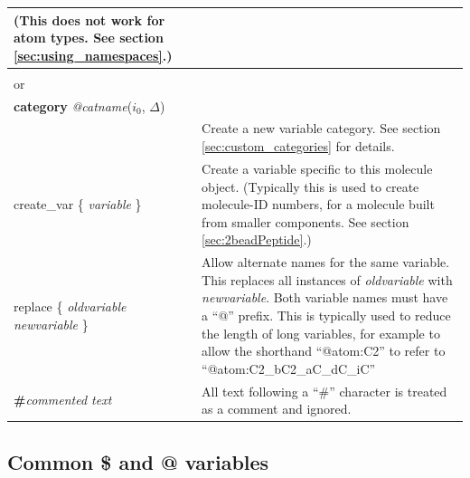 \documentclass[11pt]{article}
\begin{document}
\begin{longtable}[h]{l|p{9cm}}
(This does not work for atom types.
See section \ref{sec:using_namespaces}.)
\\
\hline
\begin{tabular}[t]{l}
\textbf{category} \textit{\$catname}($i_0$, $\Delta$)
\\
or \\
\textbf{category} \textit{@catname}($i_0$, $\Delta$)
\\
\end{tabular}
&
Create a new variable category.
See section \ref{sec:custom_categories} for details.
\\
\hline
create\_var \{ \textit{variable} \} &
Create a variable specific to this molecule object. 
(Typically this is used to create molecule-ID numbers, 
for a molecule built from smaller components.
See section \ref{sec:2beadPeptide}.)
\\
\hline
replace \{ \textit{oldvariable} \textit{newvariable} \} &
Allow alternate names for the same variable.  This replaces all instances of \textit{oldvariable} with \textit{newvariable}.  Both variable names must have a ``@'' prefix.  This is typically used to reduce the length of long variables, for example to allow the shorthand ``@atom:C2'' to refer to ``@atom:C2\_bC2\_aC\_dC\_iC''
\\
\hline
 \textbf{\#}\textit{commented text} & 
All text following a ``\#'' character is treated as a comment and ignored.
\end{longtable}





\subsection{Common \$ and @ variables}
\end{document}
